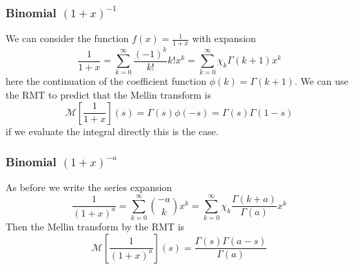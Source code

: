 \documentclass{article}
\begin{document}
\subsubsection{Binomial $(1+x)^{-1}$}
We can consider the function $f(x) = \frac{1}{1+x}$ with expansion
\begin{equation}
\frac{1}{1+x} = \sum_{k=0}^\infty \frac{(-1)^k}{k!} k! x^k = \sum_{k=0}^\infty \chi_k \Gamma(k+1) x^k
\end{equation}
here the continuation of the coefficient function $\phi(k) = \Gamma(k+1)$. We can use the RMT to predict that the Mellin transform is
\begin{equation}
\mathcal{M}\left[\frac{1}{1+x}\right](s) = \Gamma(s)\phi(-s) = \Gamma(s)\Gamma(1-s)
\end{equation}
if we evaluate the integral directly this is the case.
\subsubsection{Binomial $(1+x)^{-a}$}
As before we write the series expansion
\begin{equation}
\frac{1}{(1+x)^a} = \sum_{k=0}^\infty \binom{-a}{k} x^k = \sum_{k=0}^\infty \chi_k \frac{\Gamma(k+a)}{\Gamma(a)} x^k
\end{equation}
Then the Mellin transform by the RMT is 
\begin{equation}
\mathcal{M}\left[\frac{1}{(1+x)^a}\right](s) = \frac{\Gamma(s)\Gamma(a-s)}{\Gamma(a)}
\end{equation}
\end{document}
